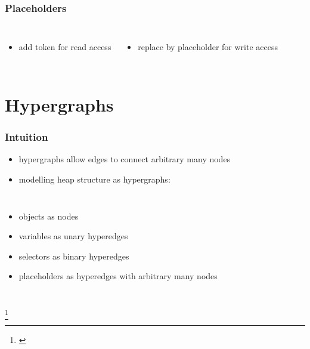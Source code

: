 \documentclass{beamer}
\newcommand\blfootnote[1]{%
	\begingroup
	\renewcommand\thefootnote{}\footnote{#1}%
	\addtocounter{footnote}{-1}%
	\endgroup
}
\begin{document}
\begin{frame}
	\frametitle{Placeholders}
		\begin{overlayarea}{\textwidth}{\textheight}
			\begin{columns}
				\begin{itemize}
					\item add token for read access
				\end{itemize}
				\begin{itemize}
					\item replace by placeholder for write access
				\end{itemize}
			\end{columns}
		\end{overlayarea}
\end{frame}

\section{Hypergraphs}
\begin{frame}
	\frametitle{Intuition}
	\begin{itemize}
		\item hypergraphs allow edges to connect arbitrary many nodes
		\item modelling heap structure as hypergraphs:
	\end{itemize}
	\begin{columns}
		\column{0.5\textwidth}
			\begin{itemize}
				\item objects as nodes
				\item variables as unary hyperedges
				\item selectors as binary hyperedges
				\item placeholders as hyperedges with arbitrary many nodes
			\end{itemize}
		\column{0.5\textwidth}
			\resizebox{\textwidth}{!}{}
	\end{columns}
	\blfootnote{\cite{InformalGraphGrammars}}
\end{frame}
\end{document}
